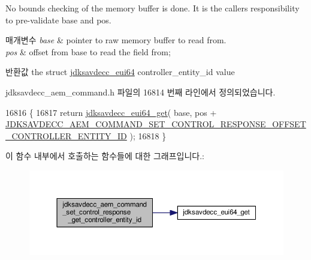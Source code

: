 No bounds checking of the memory buffer is done. It is the caller\textquotesingle{}s responsibility to pre-\/validate base and pos.


\begin{DoxyParams}{매개변수}
{\em base} & pointer to raw memory buffer to read from. \\
\hline
{\em pos} & offset from base to read the field from; \\
\hline
\end{DoxyParams}
\begin{DoxyReturn}{반환값}
the struct \hyperlink{structjdksavdecc__eui64}{jdksavdecc\+\_\+eui64} controller\+\_\+entity\+\_\+id value 
\end{DoxyReturn}


jdksavdecc\+\_\+aem\+\_\+command.\+h 파일의 16814 번째 라인에서 정의되었습니다.


\begin{DoxyCode}
16816 \{
16817     \textcolor{keywordflow}{return} \hyperlink{group__eui64_ga2652311a25a6b91cddbed75c108c7031}{jdksavdecc\_eui64\_get}( base, pos + 
      \hyperlink{group__command__set__control__response_gaae6287ac37a2c8584c0bbd4485dc474d}{JDKSAVDECC\_AEM\_COMMAND\_SET\_CONTROL\_RESPONSE\_OFFSET\_CONTROLLER\_ENTITY\_ID}
       );
16818 \}
\end{DoxyCode}


이 함수 내부에서 호출하는 함수들에 대한 그래프입니다.\+:
\nopagebreak
\begin{figure}[H]
\begin{center}
\leavevmode
\includegraphics[width=350pt]{group__command__set__control__response_gafc25171e0502e50f969dffb836cb1c07_cgraph}
\end{center}
\end{figure}


